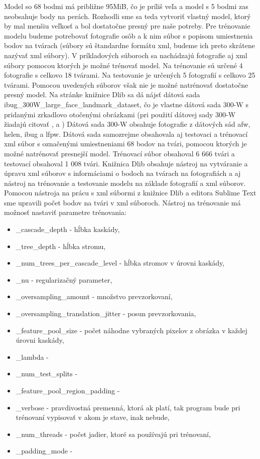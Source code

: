Model so 68 bodmi má približne 95MiB, čo je príliš veľa a model s 5 bodmi zas neobsahuje body na perách.
Rozhodli sme sa teda vytvoriť vlastný model, ktorý by mal menšiu veľkosť a bol dostatočne presný pre naše potreby.
Pre trénovanie modelu budeme potrebovať fotografie osôb a k nim súbor s popisom umiestnenia bodov na tvárach (súbory sú štandardne formátu xml, budeme ich preto skrátene nazývať xml súbory).
V príkladových súboroch sa nachádzajú fotografie aj xml súbory pomocou ktorých je možné trénovať model.
Na trénovanie sú určené 4 fotografie s celkovo 18 tvárami.
Na testovanie je určených 5 fotografií s celkovo 25 tvárami.
Pomocou uvedených súborov však nie je možné natrénovať dostatočne presný model.
Na stránke knižnice Dlib sa dá nájsť dátová sada ibug\_300W\_large\_face\_landmark\_dataset, čo je vlastne dátová sada 300-W \cite{ibug} s pridanými zrkadlovo otočenými obrázkami (pri použití dátovej sady  300-W \cite{ibug} žiadajú citovať \cite{sagonas2016300}, \cite{sagonas2013300} a \cite{sagonas2013semi}) 
Dátová sada  300-W \cite{ibug} obsahuje fotografie z dátových sád afw, helen, ibug a lfpw. 
Dátová sada samozrejme obsahovala aj testovaci a trénovací xml súbor s označenými umiestneniami 68 bodov na tvári, pomocou ktorých je možné natrénovať presnejší model.
Trénovací súbor obsahoval 6 666 tvári a testovací obsahoval 1 008 tvári.
Knižnica Dlib obsahuje nástroj na vytváranie a úpravu xml súborov s informáciami o bodoch na tvárach na fotografiách a aj nástroj na trénovanie a testovanie modelu na základe fotografií a xml súborov.
Pomocou nástroja na prácu s xml súbormi z knižnice Dlib a editora Sublime Text sme upravili počet bodov na tvári v xml súboroch.
Nástroj na trénovanie má možnosť nastaviť parametre trénovania:
 \begin{itemize}
\item \_cascade\_depth - hĺbka kaskády,
\item \_tree\_depth - hĺbka stromu, 
\item \_num\_trees\_per\_cascade\_level - hĺbka stromov v úrovni kaskády, 
\item \_nu - regularizačný parameter, 
\item \_oversampling\_amount - množstvo prevzorkovaní, 
\item \_oversampling\_translation\_jitter - posun prevzorkovania,
\item \_feature\_pool\_size - počet náhodne vybraných pixelov z obrázka v každej úrovni kaskády, 
\item \_lambda - 
\item \_num\_test\_splits - 
\item \_feature\_pool\_region\_padding - 
\item \_verbose - pravdivostná premenná, ktorá ak platí, tak program bude pri trénovaní vypisovať v akom je stave, inak nebude, 
\item \_num\_threads - počet jadier, ktoré sa používajú pri trénovaní, 
\item \_padding\_mode - 
\end{itemize} 

